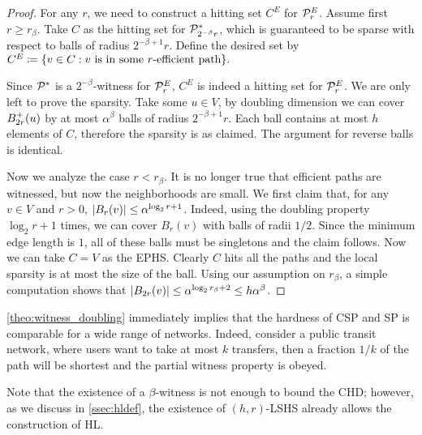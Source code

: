 \begin{proof}
	For any $r$, we need to construct a hitting set $C^E$ for $\mathcal{P}^E_r$.
	Assume first $r\geq r_\beta$.
	Take $C$ as the hitting set for $\mathcal{P}^*_{2^{-\beta}r}$, which is guaranteed to be sparse with respect to balls of radius $2^{-\beta+1}r$.
	Define the desired set by
	$
	C^E\coloneqq\{v\in C: v \text{ is in some $r$-efficient path} \}.
	$
	
	Since $\mathcal{P}^*$ is a $2^{-\beta}$-witness for $\mathcal{P}^E_r$, $C^E$ is indeed a hitting set for $\mathcal{P}^E_r$.
	We are only left to prove the sparsity.
	Take some $u\in V$, by doubling dimension we can cover $B^+_{2r}(u)$ by at most $\alpha^\beta$ balls of radius $2^{-\beta+1}r$.
	Each ball contains at most $h$ elements of $C$, therefore the sparsity is as claimed.
	The argument for reverse balls is identical.
	
	Now we analyze the case $r< r_\beta$.
	It is no longer true that efficient paths are witnessed, but now the neighborhoods are small.
	We first claim that, for any $v\in V$ and $r>0$, $\lvert B_{r}(v)\rvert\leq \alpha^{\log_2r+1}$.
	Indeed, using the doubling property $\log_2r+1$ times, we can cover $B_r(v)$ with balls of radii $1/2$.
	Since the minimum edge length is $1$, all of these balls must be singletons and the claim follows.
	Now we can take $C=V$ as the EPHS.
	Clearly $C$ hits all the paths and the local sparsity is at most the size of the ball.
	Using our assumption on $r_\beta$, a simple computation shows that $\lvert B_{2r}(v)\rvert\leq \alpha^{\log_2r_\beta+2}\leq h\alpha^\beta$. 
\end{proof}
\begin{remark}
\cref{theo:witness_doubling} immediately implies that the hardness of CSP and SP is comparable for a wide range of networks.
Indeed, consider a public transit network, where users want to take at most $k$ transfers, then a fraction $1/k$ of the path will be shortest and the partial witness property is obeyed.
\end{remark}
Note that the existence of a $\beta$-witness is not enough to bound the CHD; however, as we discuss in \cref{ssec:hldef}, the existence of $(h,r)$-LSHS already allows the construction of HL. 
